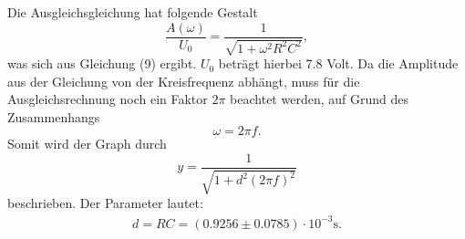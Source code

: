 \noindent Die Ausgleichsgleichung hat folgende Gestalt
\begin{equation*}
    \frac{A(\omega)}{U_0} = \frac{1}{ \sqrt{1+\omega^2R^2C^2}} ,
\end{equation*}
was sich aus Gleichung (9) ergibt. $U_0$ beträgt hierbei 7.8 Volt. Da die Amplitude aus der Gleichung von der Kreisfrequenz abhängt, 
muss für die Ausgleichsrechnung noch ein Faktor $2\pi$ beachtet werden, auf Grund des Zusammenhangs
\begin{equation}
    \omega = 2\pi f .
\end{equation}
Somit wird der Graph durch
\begin{equation}
    y = \frac{1}{ \sqrt{1+d^2(2\pi f)^2}} 
\end{equation}
beschrieben.
Der Parameter lautet:
\begin{align*}
   d = RC = (0.9256\pm  0.0785)\cdot 10^{-3} \si{\second} .
\end{align*}


